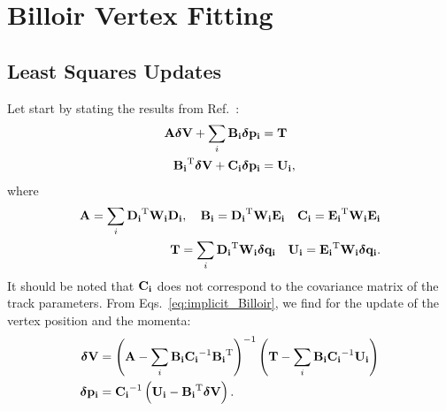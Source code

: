 \documentclass[12pt,a4paper]{scrarticle}
\begin{document}
\section{Billoir Vertex Fitting}
\subsection{Least Squares Updates}
Let start by stating the results from Ref.~\cite{billoir1992fast}:
\begin{align}
\begin{split}
\label{eq:implicit_Billoir}
    \mathbf{A} \bm{\delta} \mathbf{V} + \sum_i \mathbf{B_{i}} \bm{\delta} \mathbf{p_{i}} &= \mathbf{T} \\
    \mathbf{B_{i}}^{\mathrm{T}} \bm{\delta} \mathbf{V} + \mathbf{C_{i}} \bm{\delta} \mathbf{p_{i}} &= \mathbf{U_{i}},
\end{split}
\end{align}
where 
\begin{align*}
    \mathbf{A} = \sum_i \mathbf{D_{i}}^{\mathrm{T}} \mathbf{W_{i}} \mathbf{D_{i}}, \quad
    \mathbf{B_{i}} = \mathbf{D_{i}}^{\mathrm{T}} \mathbf{W_{i}} \mathbf{E_{i}} 
    \quad
    \mathbf{C_{i}} = \mathbf{E_{i}}^{\mathrm{T}} \mathbf{W_{i}} \mathbf{E_{i}} 
    \\
    \mathbf{T} = \sum_i \mathbf{D_{i}}^{\mathrm{T}} \mathbf{W_{i}} \bm{\delta} \mathbf{q_{i}} 
    \quad
    \mathbf{U_{i}} = \mathbf{E_{i}}^{\mathrm{T}} \mathbf{W_{i}} \bm{\delta} \mathbf{q_{i}}.
\end{align*}
%
It should be noted that $\mathbf{C_{i}}$ does not correspond to the covariance matrix of the track parameters. From Eqs.~\ref{eq:implicit_Billoir}, we find for the update of the vertex position and the momenta:
\begin{align*}
    \bm{\delta} \mathbf{V} &= \left( \mathbf{A} - \sum_i \mathbf{B_{i}} \mathbf{C_{i}}^{-1} \mathbf{B_{i}}^{\mathrm{T}} \right)^{-1} \left( \mathbf{T} - \sum_i \mathbf{B_{i}} \mathbf{C_{i}}^{-1} \mathbf{U_{i}} \right) \\
    \bm{\delta} \mathbf{p_{i}} &= \mathbf{C_{i}}^{-1} \left( \mathbf{U_{i}} - \mathbf{B_{i}}^{\mathrm{T}} \bm{\delta} \mathbf{V} \right).
\end{align*}
%
\end{document}
